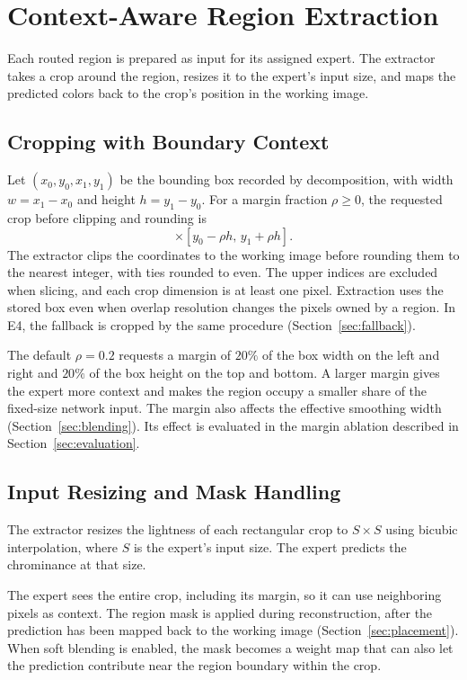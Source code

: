 \documentclass{FastFyp}
\begin{document}
\section{Context-Aware Region Extraction}
\label{sec:extraction}

Each routed region is prepared as input for its assigned expert. The extractor
takes a crop around the region, resizes it to the expert's input size, and
maps the predicted colors back to the crop's position in the working image.

\subsection{Cropping with Boundary Context}

Let $(x_0,y_0,x_1,y_1)$ be the bounding box recorded by decomposition, with
width $w=x_1-x_0$ and height $h=y_1-y_0$. For a margin fraction $\rho\geq 0$,
the requested crop before clipping and rounding is
\begin{equation}
    [x_0-\rho w,\,x_1+\rho w]\times[y_0-\rho h,\,y_1+\rho h].
\end{equation}
The extractor clips the coordinates to the working image before rounding
them to the nearest integer, with ties rounded to even. The upper indices
are excluded when slicing, and each crop dimension is at least one pixel.
Extraction uses the stored box even when overlap resolution changes the
pixels owned by a region. In E4, the fallback is cropped by the same
procedure (Section~\ref{sec:fallback}).

The default $\rho=0.2$ requests a margin of $20\%$ of the box width on the
left and right and $20\%$ of the box height on the top and bottom. A larger
margin gives the expert more context and makes the region occupy a smaller
share of the fixed-size network input. The margin also affects the effective
smoothing width (Section~\ref{sec:blending}). Its effect is evaluated in the
margin ablation described in Section~\ref{sec:evaluation}.

\subsection{Input Resizing and Mask Handling}

The extractor resizes the lightness of each rectangular crop to $S\times S$
using bicubic interpolation, where $S$ is the expert's input size. The
expert predicts the chrominance at that size.

The expert sees the entire crop, including its margin, so it can use
neighboring pixels as context. The region mask is applied during
reconstruction, after the prediction has been mapped back to the working
image (Section~\ref{sec:placement}). When soft blending is enabled, the
mask becomes a weight map that can also let the prediction contribute near
the region boundary within the crop.
\end{document}
